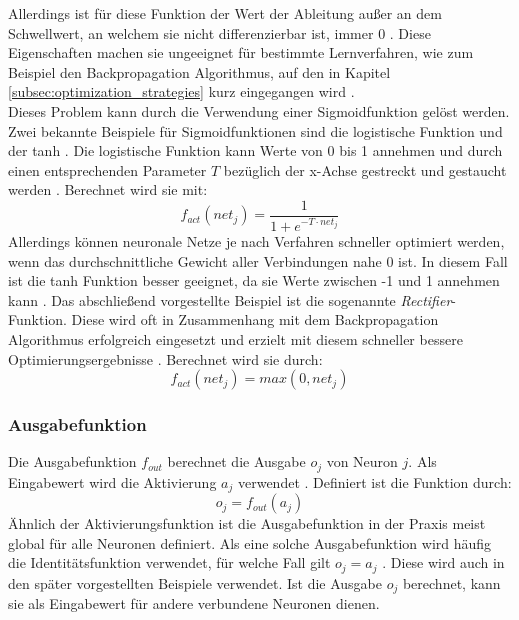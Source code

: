 Allerdings ist für diese Funktion der Wert der Ableitung außer an dem Schwellwert, an welchem sie nicht differenzierbar ist, immer $0$  \cite{kriesel2008kleiner}. Diese Eigenschaften machen sie ungeeignet für bestimmte Lernverfahren, wie zum Beispiel den Backpropagation Algorithmus, auf den in Kapitel \ref{subsec:optimization_strategies} kurz eingegangen wird \cite{kriesel2008kleiner}. \\
Dieses Problem kann durch die Verwendung einer Sigmoidfunktion gelöst werden. Zwei bekannte Beispiele für Sigmoidfunktionen sind die logistische Funktion und der \ac{tanh} \cite{lecun2012efficient}. Die logistische Funktion kann Werte von 0 bis 1 annehmen und durch einen entsprechenden Parameter $T$ bezüglich der x-Achse gestreckt und gestaucht werden \cite{kriesel2008kleiner}. Berechnet wird sie mit:
$$f_{act}(net_j)=\frac{1}{1+e^{-T\cdot net_j}}$$
Allerdings können neuronale Netze je nach Verfahren schneller optimiert werden, wenn das durchschnittliche Gewicht aller Verbindungen nahe 0 ist. In diesem Fall ist die \ac{tanh} Funktion besser geeignet, da sie Werte zwischen -1 und 1 annehmen kann  \cite{lecun2012efficient}. Das abschließend vorgestellte Beispiel ist die sogenannte \emph{Rectifier}-Funktion. Diese wird oft in Zusammenhang mit dem Backpropagation Algorithmus erfolgreich eingesetzt und erzielt mit diesem schneller bessere Optimierungsergebnisse \cite{glorot2011deep}. Berechnet wird sie durch:
$$f_{act}(net_j)= max(0, net_j)$$

\subsubsection{Ausgabefunktion}
Die Ausgabefunktion $f_{out}$ berechnet die Ausgabe $o_j$ von Neuron $j$. Als Eingabewert wird die Aktivierung $a_j$ verwendet \cite{zell2003simulation}. Definiert ist die Funktion durch:
$$o_j = f_{out}(a_j)$$
Ähnlich der Aktivierungsfunktion ist die Ausgabefunktion in der Praxis meist global für alle Neuronen definiert. Als eine solche Ausgabefunktion wird häufig die Identitätsfunktion verwendet, für welche Fall gilt $o_j = a_j$ \cite{kriesel2008kleiner}. Diese wird auch in den später vorgestellten Beispiele verwendet. Ist die Ausgabe $o_j$ berechnet, kann sie als Eingabewert für andere verbundene Neuronen dienen.

